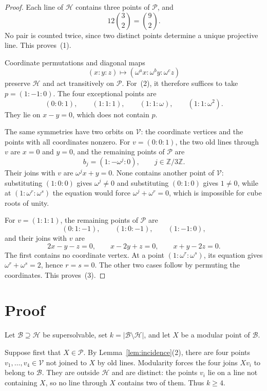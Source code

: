 \documentclass[11pt]{amsart}
\begin{document}
\begin{proof}
Each line of $\mathcal H$ contains three points of $\mathcal P$, and
\[
12\binom32=\binom92.
\]
No pair is counted twice, since two distinct points determine a unique
projective line. This proves~(1).

Coordinate permutations and diagonal maps
\[
(x:y:z)\longmapsto(\omega^a x:\omega^b y:\omega^c z)
\]
preserve $\mathcal H$ and act transitively on $\mathcal P$. For~(2), it
therefore suffices to take $p=(1:-1:0)$. The four exceptional points are
\[
(0:0:1),\qquad (1:1:1),\qquad
(1:1:\omega),\qquad (1:1:\omega^2).
\]
They lie on $x-y=0$, which does not contain $p$.

The same symmetries have two orbits on $\mathcal V$: the coordinate
vertices and the points with all coordinates nonzero. For
$v=(0:0:1)$, the two old lines through $v$ are $x=0$ and $y=0$, and the
remaining points of $\mathcal P$ are
\[
b_j=(1:-\omega^j:0),\qquad j\in\mathbb Z/3\mathbb Z.
\]
Their joins with $v$ are $\omega^j x+y=0$. None contains another point
of $\mathcal V$: substituting $(1:0:0)$ gives $\omega^j\ne0$ and
substituting $(0:1:0)$ gives $1\ne0$, while at $(1:\omega^r:\omega^s)$
the equation would force $\omega^j+\omega^r=0$, which is impossible for
cube roots of unity.

For $v=(1:1:1)$, the remaining points of $\mathcal P$ are
\[
(0:1:-1),\qquad (1:0:-1),\qquad (1:-1:0),
\]
and their joins with $v$ are
\[
2x-y-z=0,\qquad x-2y+z=0,\qquad x+y-2z=0.
\]
The first contains no coordinate vertex. At a point
$(1:\omega^r:\omega^s)$, its equation gives
$\omega^r+\omega^s=2$, hence $r=s=0$. The other two cases follow by
permuting the coordinates. This proves~(3).
\end{proof}

\section{Proof}

Let $\mathcal B\supseteq\mathcal H$ be supersolvable, set
$k=|\mathcal B\setminus\mathcal H|$, and let $X$ be a modular point of
$\mathcal B$.

Suppose first that $X\in\mathcal P$. By
Lemma~\ref{lem:incidence}(2), there are four points
$v_1,\dots,v_4\in\mathcal V$ not joined to $X$ by old lines. Modularity
forces the four joins $Xv_i$ to belong to $\mathcal B$. They are
outside $\mathcal H$ and are distinct: the points $v_i$ lie on a line
not containing $X$, so no line through $X$ contains two of them. Thus
$k\ge4$.
\end{document}
